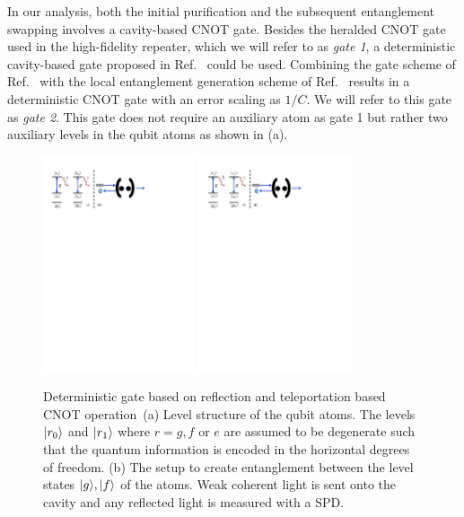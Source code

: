 In our analysis, both the initial purification and the subsequent entanglement
swapping involves a cavity-based CNOT gate. Besides the heralded CNOT gate used
in the high-fidelity repeater, which we will refer to as \emph{gate 1}, a
deterministic cavity-based gate proposed in Ref.~\cite{Anders2prl} could be
used. Combining the gate scheme of Ref.~\cite{Anders2prl} with the local
entanglement generation scheme of Ref.~\cite{Anders1prl} results in a
deterministic CNOT gate with an error scaling as $1/C$.  We will refer to this
gate as \emph{gate 2}. This gate does not require an auxiliary atom as gate 1
but rather two auxiliary levels in the qubit atoms as shown in
(a).
\begin{figure}
\centering
\includegraphics[width=0.4\textwidth]{./figs_Borregaard_PRA2015/figure4a}
\includegraphics[width=0.4\textwidth]{./figs_Borregaard_PRA2015/figure4b}
\caption[CNOT gate structure II]
{Deterministic gate based on reflection and
teleportation based CNOT operation~\cite{Anders1prl,Anders2prl}(a) Level
structure of the qubit atoms. The levels $| r_{0} \rangle$ and $| r_{1} \rangle$ where
$r=g,f$ or $e$ are assumed to be degenerate such that the quantum information is
encoded in the horizontal degrees of freedom. (b) The setup to create
entanglement between the level states $| g \rangle,| f \rangle$ of the atoms. Weak
coherent light is sent onto the cavity and any reflected light is measured with
a SPD. }
\label{fig:figure4}
\end{figure}
